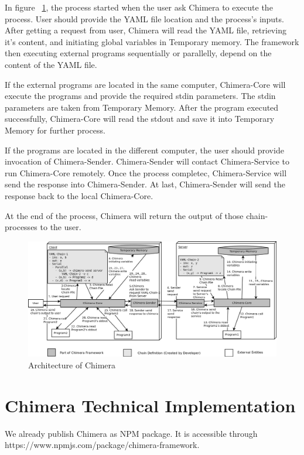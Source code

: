\documentclass[conference]{IEEEtran}
\begin{document}
In figure ~\ref{fig:chimeraArchitecture}, the process started when the user ask Chimera 
to execute the process. User should provide the YAML file location and the process's
inputs. After getting a request from user, Chimera will read the YAML file, retrieving
it's content, and initiating global variables in Temporary memory. The framework then
executing external programs sequentially or parallelly, depend on the content of the
YAML file.

If the external programs are located in the same computer, Chimera-Core will execute the
programs and provide the required stdin parameters. The stdin parameters are taken from
Temporary Memory. After the program executed successfully, Chimera-Core will read the 
stdout and save it into Temporary Memory for further process.

If the programs are located in the different computer, the user should provide
invocation of Chimera-Sender. Chimera-Sender will contact Chimera-Service to run 
Chimera-Core remotely. Once the process completec, Chimera-Service will send the
response into Chimera-Sender. At last, Chimera-Sender will send the response back to
the local Chimera-Core.

At the end of the process, Chimera will return the output of those chain-processes to 
the user.

\begin{figure}
	\centering
	\includegraphics[width=1.0\textwidth]
		{images/chimera.png}
	\caption{Architecture of Chimera}
	\label{fig:chimeraArchitecture}
\end{figure}

\section{Chimera Technical Implementation}

We already publish Chimera as NPM package. It is accessible through 
https://www.npmjs.com/package/chimera-framework.
\end{document}
